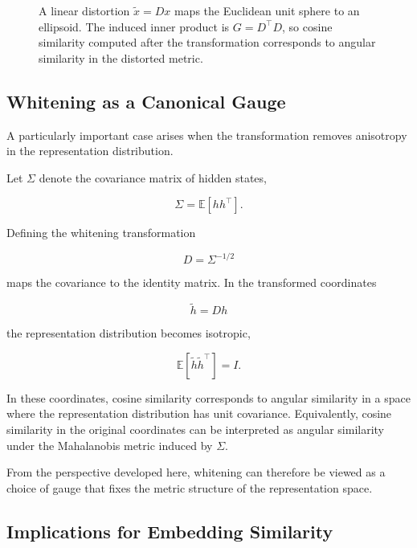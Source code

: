 \documentclass[11pt]{article}
\begin{document}
\begin{figure}[htbp]
\caption{A linear distortion $\tilde x = D x$ maps the Euclidean unit sphere to an ellipsoid. The induced inner product is $G=D^\top D$, so cosine similarity computed after the transformation corresponds to angular similarity in the distorted metric.}
\label{fig:metric-distortion-ellipse}
\end{figure}

\subsection{Whitening as a Canonical Gauge}

A particularly important case arises when the transformation removes
anisotropy in the representation distribution.

Let $\Sigma$ denote the covariance matrix of hidden states,

\[
\Sigma = \mathbb{E}[h h^\top].
\]

Defining the whitening transformation

\[
D = \Sigma^{-1/2}
\]

maps the covariance to the identity matrix.
In the transformed coordinates

\[
\tilde h = D h
\]

the representation distribution becomes isotropic,

\[
\mathbb{E}[\tilde h \tilde h^\top] = I.
\]

In these coordinates, cosine similarity corresponds to angular similarity
in a space where the representation distribution has unit covariance.
Equivalently, cosine similarity in the original coordinates can be
interpreted as angular similarity under the Mahalanobis metric induced by
$\Sigma$.

From the perspective developed here, whitening can therefore be viewed as
a choice of gauge that fixes the metric structure of the representation
space.

\subsection{Implications for Embedding Similarity}
\end{document}
